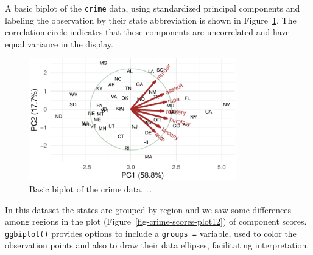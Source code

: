 \documentclass[
  letterpaper,
  10pt,
  krantz2]{krantz}
\makeatletter
\newenvironment{Shaded}{\begin{snugshade}}{\end{snugshade}}
\newcommand{\AttributeTok}[1]{\textcolor[rgb]{0.40,0.45,0.13}{#1}}
\newcommand{\CommentTok}[1]{\textcolor[rgb]{0.37,0.37,0.37}{#1}}
\newcommand{\ConstantTok}[1]{\textcolor[rgb]{0.56,0.35,0.01}{#1}}
\newcommand{\DecValTok}[1]{\textcolor[rgb]{0.68,0.00,0.00}{#1}}
\newcommand{\FunctionTok}[1]{\textcolor[rgb]{0.28,0.35,0.67}{#1}}
\newcommand{\NormalTok}[1]{\textcolor[rgb]{0.00,0.23,0.31}{#1}}
\newcommand{\OtherTok}[1]{\textcolor[rgb]{0.00,0.23,0.31}{#1}}
\newcommand{\SpecialCharTok}[1]{\textcolor[rgb]{0.37,0.37,0.37}{#1}}
\newcommand{\StringTok}[1]{\textcolor[rgb]{0.13,0.47,0.30}{#1}}
\newenvironment{kframe}{%
  \medskip{}
  \setlength{\fboxsep}{.8em}
  \def\at@end@of@kframe{}%
  \ifinner\ifhmode%
  \def\at@end@of@kframe{\end{minipage}}%
  \begin{minipage}{\columnwidth}%
  \fi\fi%
  \def\FrameCommand##1{\hskip\@totalleftmargin \hskip-\fboxsep
  \colorbox{shadecolor}{##1}\hskip-\fboxsep
      \hskip-\linewidth \hskip-\@totalleftmargin \hskip\columnwidth}%
  \MakeFramed {\advance\hsize-\width
    \@totalleftmargin\z@ \linewidth\hsize
    \@setminipage}}%
{\par\unskip\endMakeFramed%
  \at@end@of@kframe}
\renewenvironment{Shaded}{\begin{kframe}}{\end{kframe}}
\makeatother
\begin{document}
A basic biplot of the \texttt{crime} data, using standardized principal
components and labeling the observation by their state abbreviation is
shown in Figure~\ref{fig-crime-biplot1}. The correlation circle
indicates that these components are uncorrelated and have equal variance
in the display.

\begin{Shaded}
\end{Shaded}

\begin{figure}[H]

{\centering \includegraphics[width=0.8\textwidth,height=\textheight]{figs/ch04/fig-crime-biplot1-1.pdf}

}

\caption{\label{fig-crime-biplot1}Basic biplot of the crime data.
\ldots{}}

\end{figure}

In this dataset the states are grouped by region and we saw some
differences among regions in the plot
(Figure~\ref{fig-crime-scores-plot12}) of component scores.
\texttt{ggbiplot()} provides options to include a \texttt{groups\ =}
variable, used to color the observation points and also to draw their
data ellipses, facilitating interpretation.
\end{document}
